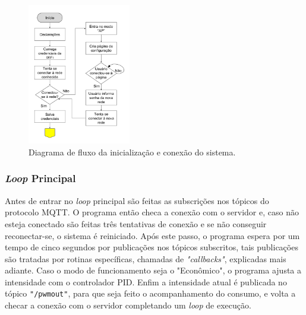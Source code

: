 \begin{figure}[ht]
    \begin{center}
    \includegraphics[width=0.4\textwidth]{figuras/flux_init.png}
    \end{center}
    \caption[Diagrama de fluxo da inicialização e conexão do sistema.]{Diagrama de fluxo da inicialização e conexão do sistema.}
    \label{finit}
\end{figure}

\subsubsection{\textit{Loop} Principal}

Antes de entrar no \textit{loop} principal são feitas as subscrições nos tópicos do protocolo MQTT. O programa então checa a conexão com o servidor e, caso não esteja conectado são feitas três tentativas de conexão e se não conseguir reconectar-se, o sistema é reiniciado. Após este passo, o programa espera por um tempo de cinco segundos por publicações nos tópicos subscritos, tais publicações são tratadas por rotinas específicas, chamadas de \textit{"callbacks"}, explicadas mais adiante. Caso o modo de funcionamento seja o "Econômico", o programa ajusta a intensidade com o controlador PID. Enfim a intensidade atual é publicada no tópico \texttt{"/pwmout"}, para que seja feito o acompanhamento do consumo, e volta a checar a conexão com o servidor completando um \textit{loop} de execução.

